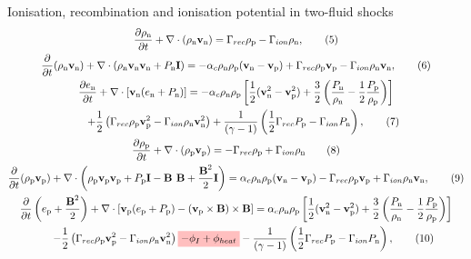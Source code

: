 \documentclass[10pt,aspectratio=169,usenames,dvipsnames]{beamer}
\newcommand{\mathcolorbox}[2]{\colorbox{#1}{$\displaystyle #2$}}
\begin{document}
\begin{frame}{Ionisation, recombination and ionisation potential in two-fluid shocks}
\footnotesize
\begin{gather}
\frac{\partial \rho _{\text{n}}}{\partial t} + \nabla \cdot (\rho _{\text{n}} \textbf{v}_{\text{n}})= \Gamma _{rec} \rho _{\rm p} - \Gamma _{ion} \rho _{\rm n}, \label{eqn:neutral1}\tag{5} \\
\frac{\partial}{\partial t}(\rho _{\text{n}} \textbf{v}_{\text{n}}) + \nabla \cdot (\rho _{\text{n}} \textbf{v}_{\text{n}} \textbf{v}_{\text{n}} + P_{\text{n}} \textbf{I}) = -\alpha _c \rho_{\text{n}} \rho_{\text{p}} (\textbf{v}_{\text{n}}-\textbf{v}_{\text{p}}) + \Gamma _{rec} \rho _{\rm p} \textbf{v}_{\rm p} - \Gamma _{ion} \rho_{\rm n} \textbf{v}_{\rm n},\tag{6} \\
\frac{\partial e_{\text{n}}}{\partial t} + \nabla \cdot \left[\textbf{v}_{\text{n}} (e_{\text{n}} +P_{\text{n}}) \right] = -\alpha _c \rho _{\text{n}} \rho _{\text{p}} \left[ \frac{1}{2} (\textbf{v}_{\text{n}} ^2 - \textbf{v}_{\text{p}} ^2)+ \frac{3}{2} \left(\frac{P_{\rm n}}{\rho_{\rm n}}-\frac{1}{2}\frac{P_{\rm p}}{\rho_{\rm p}}\right) \right] \nonumber \\ \hspace{0.5cm}+ \frac{1}{2} \left( \Gamma _{rec} \rho _{\rm p} \textbf{v}_{\rm p} ^2 - \Gamma _{ion} \rho _{\rm n} \textbf{v}_{\rm n} ^2 \right) +\frac{1}{ (\gamma-1)} \left( \frac{1}{2} \Gamma _{rec} P_{\rm p} -\Gamma _{ion} P_{\rm n} \right), \tag{7}\\
\frac{\partial \rho _{\text{p}}}{\partial t} + \nabla \cdot (\rho_{\text{p}} \textbf{v}_{\text{p}}) = - \Gamma _{rec} \rho _{\rm p} + \Gamma _{ion} \rho _{\rm n} \label{eqn:plasma1}\tag{8}\\
\frac{\partial}{\partial t} (\rho_{\text{p}} \textbf{v}_{\text{p}})+ \nabla \cdot \left( \rho_{\text{p}} \textbf{v}_{\text{p}} \textbf{v}_{\text{p}} + P_{\text{p}} \textbf{I} - \textbf{B B} + \frac{\textbf{B}^2}{2} \textbf{I} \right) = \alpha _c \rho_{\text{n}} \rho_{\text{p}}(\textbf{v}_{\text{n}} - \textbf{v}_{\text{p}}) - \Gamma _{rec} \rho _{\rm p} \textbf{v}_{\rm p} + \Gamma _{ion} \rho_{\rm n} \textbf{v}_{\rm n},\tag{9}\\
\frac{\partial}{\partial t} \left( e_{\text{p}} + \frac{\textbf{B}^2}{2} \right) + \nabla \cdot \left[ \textbf{v}_{\text{p}} ( e_{\text{p}} + P_{\text{p}}) -  (\textbf{v}_{\rm p} \times \textbf{B}) \times \textbf{B} \right]  =  \alpha _c \rho _{\text{n}} \rho _{\text{p}} \left[ \frac{1}{2} (\textbf{v}_{\text{n}} ^2 - \textbf{v}_{\text{p}} ^2)+ \frac{3}{2} \left(\frac{P_{\rm n}}{\rho_{\rm n}}-\frac{1}{2}\frac{P_{\rm p}}{\rho_{\rm p}}\right) \right] \nonumber \\ \hspace{0.5cm}- \frac{1}{2} \left( \Gamma _{rec} \rho _{\rm p} \textbf{v}_{\rm p} ^2 - \Gamma _{ion} \rho _{\rm n} \textbf{v}_{\rm n} ^2 \right) \mathcolorbox{pink}{- \phi_I + \phi_{heat}} -\frac{1}{ (\gamma-1)} \left( \frac{1}{2} \Gamma _{rec} P_{\rm p} -\Gamma _{ion} P_{\rm n} \right), \label{eqn:ep} \tag{10}\\

\end{gather}
\end{frame}
\end{document}
